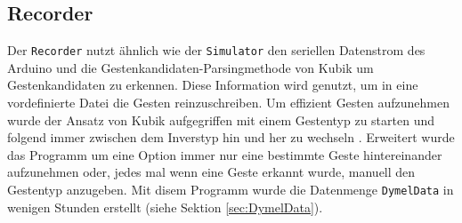 \subsection{Recorder}
Der \texttt{Recorder} nutzt ähnlich wie der \texttt{Simulator} den seriellen Datenstrom des Arduino und die Gestenkandidaten-Parsingmethode von Kubik um Gestenkandidaten zu erkennen. Diese Information wird genutzt, um in
eine vordefinierte Datei die Gesten reinzuschreiben. Um effizient Gesten aufzunehmen wurde der Ansatz von Kubik aufgegriffen mit einem Gestentyp zu starten und folgend immer zwischen dem Inverstyp
hin und her zu wechseln \cite{venzkeArticle}. Erweitert wurde das Programm um eine Option immer nur eine bestimmte Geste hintereinander aufzunehmen oder, jedes mal wenn eine Geste erkannt wurde, manuell den Gestentyp
anzugeben. Mit disem Programm wurde die Datenmenge \texttt{DymelData} in wenigen Stunden erstellt (siehe Sektion \ref{sec:DymelData}).
